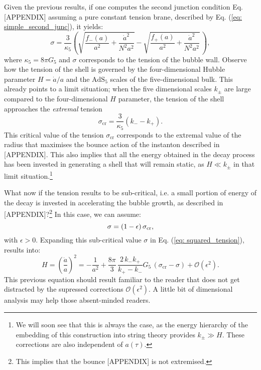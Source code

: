 \documentclass[12pt, a4paper]{article} %
\begin{document}
Given the previous results, if one computes the second junction condition Eq. [APPENDIX] assuming a pure constant tension brane, described by Eq. (\ref{eq: simple_second_junc}), it yields:
\begin{equation}\label{eq: squared_tension}
	\sigma=\frac{3}{\kappa_5}\left(\sqrt{\frac{f_{-}(a)}{a^2}+\frac{\dot{a}^2}{N^2 a^2}}-\sqrt{\frac{f_{+}(a)}{a^2}+\frac{\dot{a}^2}{N^2 a^2}}\,\right),
\end{equation}
where $\kappa_{5} = 8 \pi G_{5}$ and $\sigma$ corresponds to the tension of the bubble wall. Observe how the tension of the shell is governed by the four-dimensional Hubble parameter $H = \dot{a}/a$ and the $\text{AdS}_{5}$ scales of the five-dimensional bulk. This already points to a limit situation; when the five dimensional scales $k_{\pm}$ are large compared to the four-dimensional $H$ parameter, the tension of the shell approaches the \textit{extremal} tension
\begin{equation}\label{eq: critical_tension}
	\sigma_{\text{cr}} = \frac{3}{\kappa_{5}} \left(k_{-} - k_{+} \right).
\end{equation}
This critical value of the tension $\sigma_{\text{cr}}$ corresponds to the extremal value of the radius that maximises the bounce action of the instanton described in [APPENDIX]. This also implies that all the energy obtained in the decay process has been invested in generating a shell that will remain static, as $H\ll k_{\pm}$ in that limit situation.\footnote{We will soon see that this is always the case, as the energy hierarchy of the embedding of this construction into string theory provides $k_{\pm} \gg H$. These corrections are also independent of $a(\tau)$.} 

What now if the tension results to be sub-critical, i.e. a small portion of energy of the decay is invested in accelerating the bubble growth, as described in [APPENDIX]?\footnote{This implies that the bounce [APPENDIX] is not extremised.} In this case, we can assume:
\begin{equation}
	\sigma = (1- \epsilon) \, \sigma_{\text{\text{cr}}},
\end{equation}
with $\epsilon > 0$. Expanding this sub-critical value $\sigma$ in Eq. (\ref{eq: squared_tension}), results into:
\begin{equation}\label{eq: friedmann_from_junc}
	H = \left(\frac{\dot{a}}{a}\right)^2=-\frac{1}{a^2}+\frac{8 \pi}{3} \, \frac{ 2 \, k_{-}k_{+}}{k_{+} - k_{-}} G_5\,\left(\sigma_{\text{cr}}-\sigma\right)+\mathcal{O}\left(\epsilon^2\right).
\end{equation}
This previous equation should result familiar to the reader that does not get distracted by the supressed corrections $\mathcal{O}\left(\epsilon^2\right)$. A little bit of dimensional analysis may help those absent-minded readers. 
\end{document}
